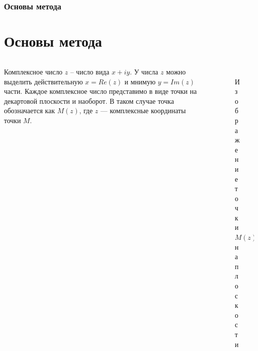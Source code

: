 \documentclass{beamer}
\newcommand\frametitleSpec[1]{%
\frametitle{#1}
\section{#1}%
}
\begin{document}
\begin{frame}
   \frametitleSpec{Основы метода}
   \begin{columns}
      \begin{column}{0.5\textwidth}
         Комплексное число \(z\) -- число вида $x + iy$. У числа \(z\) можно выделить действительную $x = Re(z)$ и мнимую $y=Im(z)$ части. Каждое комплексное число представимо в виде точки на декартовой плоскости и наоборот. В таком случае точка обозначается как \(M(z)\), где \(z\) --- комплексные координаты точки \(M\).
      \end{column}
      \begin{column}{0.5\textwidth}
         \begin{figure}
            \centering
            \includegraphics[width=1\textwidth]{images/theory-1.pdf}
            \caption{Изображение точки \(M(z)\) на плоскости}
            \label{img1}
         \end{figure}
      \end{column}
   \end{columns}
\end{frame}
\end{document}

